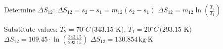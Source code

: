Determine \( \Delta S_{12} \):  
\( \Delta S_{12} = s_2 - s_1 = m_{12} (s_2 - s_1) \)  
\( \Delta S_{12} = m_{12} \ln \left( \frac{T_2}{T_1} \right) \)  

Substitute values:  
\( T_2 = 70^\circ C \, \text{(343.15 K)}, \, T_1 = 20^\circ C \, \text{(293.15 K)} \)  
\( \Delta S_{12} = 109.45 \cdot \ln \left( \frac{343.15}{293.15} \right) \)  
\( \Delta S_{12} = 130.854 \, \text{kg·K} \)